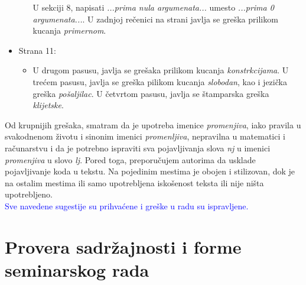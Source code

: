 \documentclass[a4paper]{report}
\newcommand{\odgovor}[1]{\textcolor{blue}{#1}}
\begin{document}
\begin{itemize}
\begin{itemize}
        U sekciji 8, napisati \textit{...prima nula argumenata...} umesto \textit{...prima 0 argumenata...}. U zadnjoj rečenici na strani javlja se greška prilikom kucanja \textit{primernom}.
    \end{itemize}
    \item Strana 11:
    \begin{itemize}
        \item U drugom pasusu, javlja se grešaka prilikom kucanja \textit{konstrkcijama}. U trećem pasusu, javlja se greška pilikom kucanja \textit{slobodan}, kao i jezička greška \textit{pošaljilac}. U četvrtom pasusu, javlja se štamparska greška \textit{klijetske}.
    \end{itemize}
\end{itemize}

Od krupnijih grešaka, smatram da je upotreba imenice \textit{promenjiva}, iako pravila u svakodnenom životu i sinonim imenici \textit{promenljiva}, nepravilna u matematici i računarstvu i da je potrebno ispraviti sva pojavljivanja slova \textit{nj} u imenici \textit{promenjiva} u slovo \textit{lj}.
Pored toga, preporučujem autorima da usklade pojavljivanje koda u tekstu. Na pojedinim mestima je obojen i stilizovan, dok je na ostalim mestima ili samo upotrebljena iskošenost teksta ili nije ništa upotrebljeno.\\ 

\odgovor{Sve navedene sugestije su prihvaćene i greške u radu su ispravljene.}

\section{Provera sadržajnosti i forme seminarskog rada}
\end{document}

